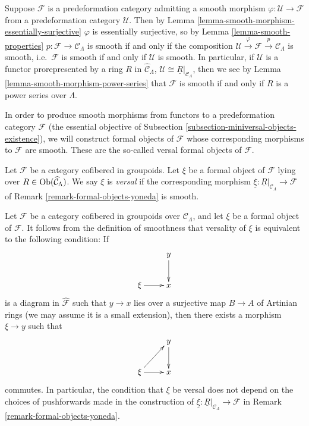 \begin{remark}
\label{remark-smooth-on-top}
Suppose $\mathcal F$ is a predeformation category admitting a smooth morphism 
$\varphi: \mathcal U \rightarrow \mathcal F$ from a predeformation category 
$\mathcal U$.  Then by
Lemma \ref{lemma-smooth-morphism-essentially-surjective} 
$\varphi$ is essentially surjective, so by
Lemma \ref{lemma-smooth-properties} 
$p: \mathcal F \rightarrow \mathcal C_{\Lambda}$ is smooth if and only if the 
composition $\mathcal U \xrightarrow{\varphi} \mathcal F \xrightarrow{p} 
\mathcal C_{\Lambda}$ is smooth, i.e.\ $\mathcal F$ is smooth if and only if 
$\mathcal U$ is smooth.  In particular, if $\mathcal U$ is a functor 
prorepresented by a ring $R$ in $\widehat{\mathcal C}_{\Lambda}$, $\mathcal U 
\cong \underline{R}|_{\mathcal C_{\Lambda}}$, then we see by
Lemma  \ref{lemma-smooth-morphism-power-series}
that $\mathcal F$ is smooth if and
only if $R$ is a power series over $\Lambda$.
\end{remark}

\noindent
In order to produce smooth morphisms from functors to a predeformation category 
$\mathcal F$ (the essential objective of
Subsection \ref{subsection-miniversal-objects-existence}),
we will construct formal 
objects of $\mathcal F$ whose corresponding morphisms to $\mathcal F$ are 
smooth.  These are the so-called versal formal objects of $\mathcal F$.

\begin{definition}
\label{definition-versal}
Let $\mathcal F$ be a category cofibered in groupoids.  Let $\xi$ be a formal 
object of $\mathcal F$ lying over $R \in \textnormal{Ob}(\widehat{\mathcal 
C}_{\Lambda})$.  We say $\xi$ is {\it versal} if the corresponding morphism 
$\underline{\xi}: \underline{R}|_{\mathcal C_{\Lambda}} \rightarrow \mathcal F$ 
of Remark \ref{remark-formal-objects-yoneda} is smooth.
\end{definition}

\begin{remark}
\label{remark-versal-object}
Let $\mathcal F$ be a category cofibered in groupoids over $\mathcal 
C_{\Lambda}$, and let $\xi$ be a formal object of $\mathcal F$.  It follows 
from the definition of smoothness that versality of $\xi$ is equivalent to the 
following condition: If 
\[
\xymatrix{
            &  y \ar[d] \\
\xi \ar[r]  &  x
}
\]
is a diagram in $\widehat{\mathcal F}$ such that $y \rightarrow x$ lies over a 
surjective map $B \rightarrow A$ of Artinian rings (we may assume it is a small 
extension),  then there exists a morphism $\xi \rightarrow y$ such that
\[
\xymatrix{
            &  y \ar[d] \\
\xi \ar[r] \ar[ur]  &  x
}
\] 
commutes. In particular, the condition that $\xi$ be versal does not depend on 
the choices of pushforwards made in the construction of $\underline{\xi}: 
\underline{R}|_{\mathcal C_{\Lambda}} \rightarrow \mathcal F$ in Remark 
\ref{remark-formal-objects-yoneda}.
\end{remark}

